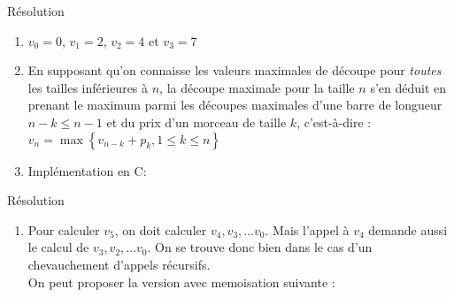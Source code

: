 \documentclass[10pt]{beamer}
\begin{document}
\begin{frame}{\Ctitle}{\stitle}
	\begin{exampleblock}{Résolution}
		\begin{enumerate}
			\item<1-> \textcolor{OliveGreen}{\small $v_0=0$, $v_1=2$, $v_2 = 4$ et $v_3 = 7$ }
			\item<2-> \textcolor{OliveGreen}{\small En supposant qu'on connaisse les valeurs maximales de découpe pour \textit{toutes} les tailles inférieures à $n$, la découpe maximale pour la taille $n$ s'en déduit en prenant le maximum parmi les découpes maximales d'une barre de longueur $n-k \leq n-1$  et du prix d'un morceau de taille $k$, c'est-à-dire :
					$v_n = \max\left\{ v_{n-k} + p_{k},  1 \leq k \leq n\right\}$}
			\item<3-> \textcolor{OliveGreen}{\small Implémentation en C:}
		\end{enumerate}
	\end{exampleblock}
\end{frame}


\begin{frame}{\Ctitle}{\stitle}
	\begin{exampleblock}{Résolution}
		\begin{enumerate}
			\addtocounter{enumi}{3}
			\item Pour calculer $v_5$, on doit calculer $v_4, v_3, \dots v_0$. Mais l'appel à $v_4$ demande aussi le calcul de $v_3, v_2, \dots v_0$. On se trouve donc bien dans le cas d'un chevauchement d'appels récursifs. \\
			\medskip
			On peut proposer la version avec memoisation suivante :
		\end{enumerate}
	\end{exampleblock}
\end{frame}
\end{document}
